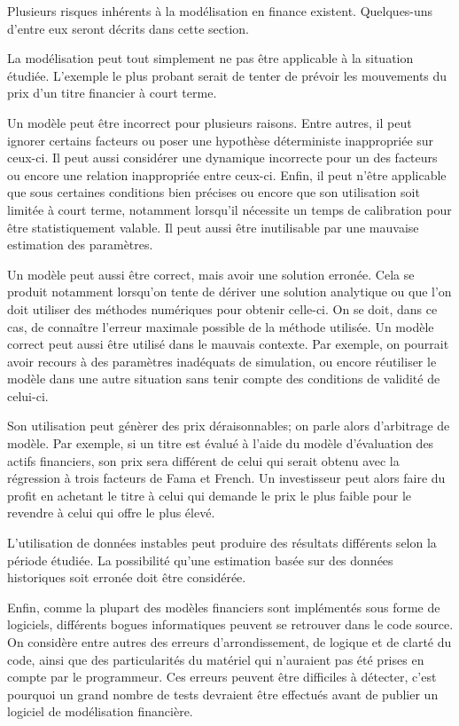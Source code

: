 Plusieurs risques inhérents à la modélisation en finance
existent. Quelques-uns d'entre eux seront décrits dans cette section.

La modélisation peut tout simplement ne pas être applicable à la
situation étudiée. L'exemple le plus probant serait de tenter de
prévoir les mouvements du prix d'un titre financier à court terme.

Un modèle peut être incorrect pour plusieurs raisons. Entre autres, il
peut ignorer certains facteurs ou poser une hypothèse déterministe
inappropriée sur ceux-ci. Il peut aussi considérer une dynamique
incorrecte pour un des facteurs ou encore une relation inappropriée
entre ceux-ci. Enfin, il peut n'être applicable que sous certaines
conditions bien précises ou encore que son utilisation soit limitée à
court terme, notamment lorsqu'il nécessite un temps de calibration
pour être statistiquement valable. Il peut aussi être inutilisable par
une mauvaise estimation des paramètres.

Un modèle peut aussi être correct, mais avoir une solution
erronée. Cela se produit notamment lorsqu'on tente de dériver une
solution analytique ou que l'on doit utiliser des méthodes numériques
pour obtenir celle-ci. On se doit, dans ce cas, de connaître l'erreur
maximale possible de la méthode utilisée. Un modèle correct peut aussi
être utilisé dans le mauvais contexte. Par exemple, on pourrait avoir
recours à des paramètres inadéquats de simulation, ou encore réutiliser le
modèle dans une autre situation sans tenir compte des
conditions de validité de celui-ci.

Son utilisation peut génèrer des prix déraisonnables; on parle alors
d'arbitrage de modèle. Par exemple, si un titre est évalué à l'aide du
modèle d'évaluation des actifs financiers, son prix sera différent de
celui qui serait obtenu avec la régression à trois facteurs de Fama et
French. Un investisseur peut alors faire du profit en achetant le
titre à celui qui demande le prix le plus faible pour le revendre à
celui qui offre le plus élevé.

L'utilisation de données instables peut produire des résultats
différents selon la période étudiée. La possibilité qu'une estimation
basée sur des données historiques soit erronée doit être considérée.

Enfin, comme la plupart des modèles financiers sont implémentés sous
forme de logiciels, différents bogues informatiques peuvent se
retrouver dans le code source. On considère entre autres des erreurs
d'arrondissement, de logique et de clarté du code, ainsi que des
particularités du matériel qui n'auraient pas été prises en compte par
le programmeur. Ces erreurs peuvent être difficiles à détecter, c'est
pourquoi un grand nombre de tests devraient être effectués avant de
publier un logiciel de modélisation financière.


